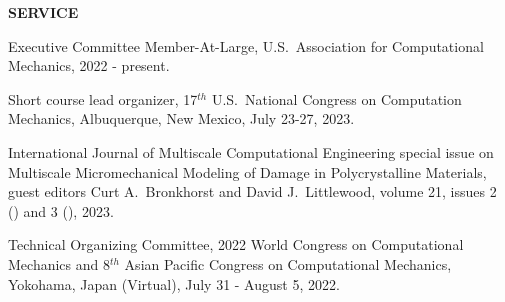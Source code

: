 
\vspace{\sectionskip}
\noindent
{\large \textbf{SERVICE}}
\vspace{\sectionskip}

\begin{minipage}{\minipagewidth}
Executive Committee Member-At-Large, U.S.~Association for Computational Mechanics, 2022 - present.
\end{minipage}\vspace{\itemskip}
\vspace{0.01in}

\begin{minipage}{\minipagewidth}
Short course lead organizer, 17$^{th}$ U.S.~National Congress on Computation Mechanics, Albuquerque, New Mexico, July 23-27, 2023.
\end{minipage}\vspace{\itemskip}
\vspace{0.01in}

\begin{minipage}{\minipagewidth}
International Journal of Multiscale Computational Engineering special issue on Multiscale Micromechanical Modeling of Damage in Polycrystalline Materials, guest editors Curt A.~Bronkhorst and David J.~Littlewood, volume 21, issues 2 () and 3 (), 2023.
\end{minipage}\vspace{\itemskip}
\vspace{0.01in}

\begin{minipage}{\minipagewidth}
Technical Organizing Committee, 2022 World Congress on Computational Mechanics and 8$^{th}$ Asian Pacific Congress on Computational Mechanics, Yokohama, Japan (Virtual), July 31 - August 5, 2022.
\end{minipage}\vspace{\itemskip}
